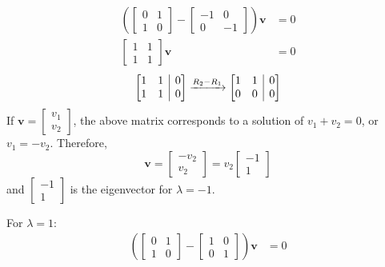 \documentclass[11pt]{article}
\makeatletter
\newenvironment{amatrix}[1]{%
    \left[\begin{array}{@{}*{#1}{c}|c@{}}
}{%
    \end{array}\right]
}
\makeatother
\begin{document}
\begin{enumerate}[label=\textbf{\arabic*.}, start=3]
{\begin{enumerate}[label=\textbf{(\alph*)}]
{                    \begin{align*}
                        \left(\begin{bmatrix}0 & 1 \\ 1 & 0\end{bmatrix}-\begin{bmatrix}-1 & 0 \\ 0 & -1\end{bmatrix}\right)\mathbf{v}&=0 \\
                        \begin{bmatrix}1 & 1 \\ 1 & 1\end{bmatrix}\mathbf{v}&=0
                    \end{align*}
                    \begin{equation*}
                        \begin{amatrix}{2}1 & 1 & 0 \\ 1 & 1 & 0\end{amatrix}
                        \xrightarrow{R_2-R_1}
                        \begin{amatrix}{2}1 & 1 & 0 \\ 0 & 0 & 0\end{amatrix}
                    \end{equation*}
                    If \(\mathbf{v}=\begin{bmatrix}v_1 \\ v_2\end{bmatrix}\), the above matrix corresponds to a solution of \(v_1+v_2=0\), or \(v_1=-v_2\). Therefore,
                    \[\mathbf{v}=\begin{bmatrix}-v_2 \\ v_2\end{bmatrix}=v_2\begin{bmatrix}-1 \\ 1\end{bmatrix}\]
                    and \(\begin{bmatrix}-1 \\ 1\end{bmatrix}\) is the eigenvector for \(\lambda=-1\).
                    \par
                    For \(\lambda=1\):
                    \begin{align*}
                    \left(\begin{bmatrix}0 & 1 \\ 1 & 0\end{bmatrix}-\begin{bmatrix}1 & 0 \\ 0 & 1\end{bmatrix}\right)\mathbf{v}&=0 \\

\end{align*}}
\end{enumerate}}
\end{enumerate}
\end{document}
